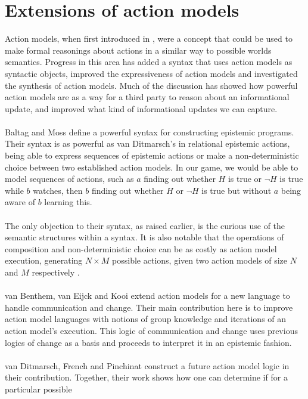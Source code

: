 \section{Extensions of action models}
Action models, when first introduced in \cite{baltag1998lpa}, were a concept that could be used to make
formal reasonings about actions in a similar way to possible worlds semantics.
Progress in this area has added a syntax that uses action models as syntactic
objects, improved the expressiveness of action models and investigated the
synthesis of action models.
Much of the discussion has showed how powerful action models are as a way for a
third party to reason about an informational update, and improved what kind of
informational updates we can capture.\\
\\
Baltag and Moss \cite{baltag2005programs} define a powerful syntax for constructing epistemic programs.
Their syntax is as powerful as van Ditmarsch's in relational epistemic actions,
being able to express sequences of epistemic actions or make a non-deterministic
choice between two established action models.
In our game, we would be able to model sequences of actions, such as $a$ finding
out whether $H$ is true or $\neg H$ is true while $b$ watches, then $b$ finding out
whether $H$ or $\neg H$ is true but without $a$ being aware of $b$ learning this.\\
\\
The only objection to their syntax, as raised earlier, is the curious use of
the semantic structures within a syntax.
It is also notable that the operations of composition and non-deterministic
choice can be as costly as action model execution, generating $N \times M$
possible actions, given two action models of size $N$ and $M$
respectively \cite{baltag2005programs}.\\
\\
van Benthem, van Eijck and Kooi \cite{benthem2006lcc} extend action models for a new language to
handle communication and change.
Their main contribution here is to improve action model languages with notions
of group knowledge and iterations of an action model's execution.
This logic of communication and change uses previous logics of change as a basis
and proceeds to interpret it in an epistemic fashion.\\
\\
van Ditmarsch, French and Pinchinat \cite{van2009simulation,van2010future} construct a future action model logic in
their contribution.
Together, their work shows how one can determine if for a particular possible
